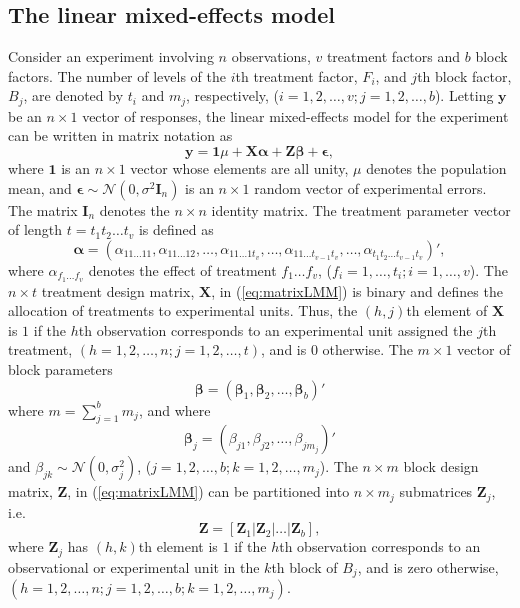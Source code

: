 \documentclass[article]{jss}
\newcommand{\I}{\mathbf{I}}
\newcommand{\Z}{\mathbf{Z}}
\newcommand{\X}{\mathbf{X}}
\begin{document}
\subsection{The linear mixed-effects model}
\label{subsec:matrixLMM}
Consider an experiment involving $n$ observations, $v$ treatment factors and $b$ block factors. The number of levels of the $i$th treatment factor, $F_i$, and $j$th block factor, $B_j$, are denoted by $t_i$ and $m_j$, respectively, ($i = 1,2, \dots, v; j = 1,2,\dots, b$). Letting $\bm{y}$ be an $n \times 1$ vector of responses, the linear mixed-effects model for the experiment can be written in matrix notation as
\begin{equation}\label{eq:matrixLMM}
\bm{y} = \mathbf{1}\mu + \X \bm{\alpha} + \Z\bm{\beta} + \bm{\epsilon},
\end{equation}
where $\mathbf{1}$ is an $n \times 1$ vector whose elements are all unity, $\mu$ denotes the population mean, and $\bm{\epsilon}\sim \mathcal{N}(0,\sigma^2 \I_n)$ is an $n \times 1$ random vector of experimental errors. The matrix $\I_n$ denotes the $n \times n$ identity matrix. The treatment parameter vector of length $t = t_1 t_2  \dots  t_v$ is defined as 
\begin{equation}
\label{eq:treatPar}
\bm{\alpha} = (\alpha_{11 \dots 11}, \alpha_{11 \dots 12}, \dots,  \alpha_{1 1 \dots 1t_v},\dots,\alpha_{1 1 \dots t_{v-1}t_v},\dots,\alpha_{t_1 t_2 \dots t_{v-1}t_v})',
\end{equation}
where $\alpha_{f_1 \dots f_v}$ denotes the effect of treatment $f_1 \dots f_v$, ($f_i = 1, \dots, t_i; i = 1,\dots, v$). The $n \times t$ treatment design matrix, $\X$, in (\ref{eq:matrixLMM}) is binary and defines the allocation of treatments to experimental units. Thus, the $(h,j)$th element of $\X$ is $1$ if the $h$th observation corresponds to an experimental unit assigned the $j$th treatment, $(h=1,2,\dots,n; j=1,2,\dots, t)$, and is $0$ otherwise. The $m \times 1$ vector of block parameters 
\begin{equation}\label{eq:block1Par}
\bm{\beta} = (\bm{\beta}_1, \bm{\beta}_2, \ldots, \bm{\beta}_b)'
\end{equation} 
where $m=\sum_{j=1}^{b}m_j$, and where
\[
\bm{\beta}_j = (\beta_{j1}, \beta_{j2}, \dots, \beta_{j m_j})'
\]
and 
$\beta_{jk} \sim \mathcal{N}(0, \sigma_j^2)$, ($j=1,2,\dots,b; k=1,2,\dots, m_j$). The $n \times m$ block design matrix, $\Z$, in (\ref{eq:matrixLMM}) can be partitioned into $n \times m_j$ submatrices $\Z_j$, i.e.\ 
\begin{equation}\label{eq:block1Mat}
\Z = [\Z_1 \vert \Z_2 \vert \ldots \vert \Z_b],
\end{equation}
where $\Z_j$ has $(h,k)$th element is $1$ if the $h$th observation corresponds to an observational or experimental unit in the $k$th block of $B_j$, and is zero otherwise, $(h=1,2,\dots,n; j=1,2,\dots,b; k=1,2,\dots, m_j)$. 
\end{document}
